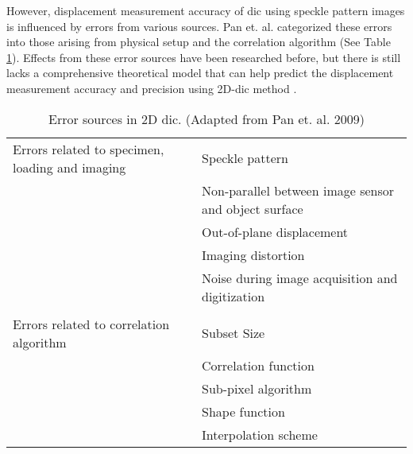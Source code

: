     \vspace{5mm}
    \noindent However, displacement measurement accuracy of \gls{dic} using speckle pattern images is influenced by errors from various sources. Pan et. al. categorized these errors into those arising from physical setup and the correlation algorithm (See Table \ref{table:error_sources_pan_review}). Effects from these error sources have been researched before, but there is still lacks a comprehensive theoretical model that can help predict the displacement measurement accuracy and precision using 2D-\gls{dic} method \cite{pan_review}. 

    \vspace{5mm}
    \begin{table}[h]
        \centering
        \footnotesize
        \renewcommand{\arraystretch}{1.2}
        \begin{tabular}{p{7cm}p{7cm}}
            \toprule
            Errors related to specimen, loading and imaging & Speckle pattern \\
            & Non-parallel between image sensor and object surface \\
            & Out-of-plane displacement \\
            & Imaging distortion \\
            & Noise during image acquisition and digitization \\

            \\

            Errors related to correlation algorithm & Subset Size \\
            & Correlation function \\
            & Sub-pixel algorithm \\
            & Shape function \\
            & Interpolation scheme \\
            \bottomrule
        \end{tabular}
        \caption{Error sources in 2D \gls{dic}. \cite{pan_review} (Adapted from Pan et. al. 2009)}
        \label{table:error_sources_pan_review}
    \end{table}

